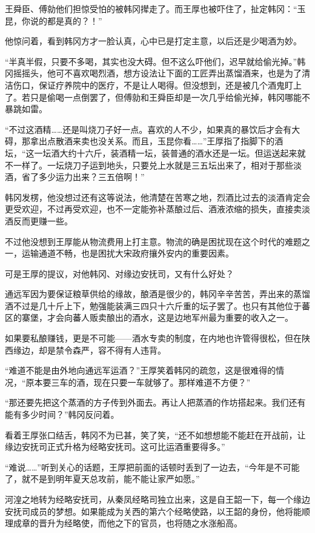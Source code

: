 王舜臣、傅勍他们担惊受怕的被韩冈撵走了。而王厚也被吓住了，扯定韩冈：“玉昆，你说的都是真的？！”

他惊问着，看到韩冈方才一脸认真，心中已是打定主意，以后还是少喝酒为妙。

“半真半假，只要不多喝，其实也没大碍。但不这么吓他们，迟早就给偷光掉。”韩冈摇摇头，他可不喜欢喝烈酒，想方设法让下面的工匠弄出蒸馏酒来，也是为了清洁伤口，保证疗养院中的医疗，不是让人喝得。但没想到，还是被几个酒鬼盯上了。若只是偷喝一点倒罢了，但傅勍和王舜臣却是一次几乎给偷光掉，韩冈哪能不暴跳如雷。

“不过这酒精……还是叫烧刀子好一点。喜欢的人不少，如果真的暴饮后才会有大碍，那拿出点散酒来卖也没关系。而且，玉昆你看……”王厚指了指脚下的酒坛，“这一坛酒大约十六斤，装酒精一坛，装普通的酒水还是一坛。但运送起来就不一样了。一坛烧刀子运到地头，只要兑上水就是三五坛出来了，相对于那些淡酒，省了多少运力出来？三五倍啊！”

韩冈发楞，他没想过还有这等说法，他清楚在苦寒之地，烈酒比过去的淡酒肯定会更受欢迎，不过再受欢迎，也不一定能弥补蒸酿过后、酒液浓缩的损失，直接卖淡酒反而更赚一些。

不过他没想到王厚能从物流费用上打主意。物流的确是困扰现在这个时代的难题之一，运输通道不畅，也是困扰大宋政府攘外安内的重要因素。

可是王厚的提议，对他韩冈、对缘边安抚司，又有什么好处？

通远军因为要保证粮草供给的缘故，酿酒是很少的，韩冈辛辛苦苦，弄出来的蒸馏酒不过是几十斤上下，勉强能装满三四只十六斤重的坛子罢了。也只有其他位于蕃区的寨堡，才会向蕃人贩卖酿出的酒水，这是边地军州最为重要的收入之一。

如果要私酿赚钱，更是不可能——酒水专卖的制度，在内地也许管得很松，但在陕西缘边，却是禁令森严，容不得有人违背。

“难道不能是由外地向通远军运酒？”王厚笑着韩冈的疏忽，这是很难得的情况，“原本要三车的酒，现在只要一车就够了。那样难道不方便？”

“那还要先把这个蒸酒的方子传到外面去。再让人把蒸酒的作坊搭起来。我们还有能有多少时间？”韩冈反问着。

看着王厚张口结舌，韩冈不为已甚，笑了笑，“还不如想想能不能赶在开战前，让缘边安抚司正式升格为经略安抚司。这可比运酒重要得多。”

“难说……”听到关心的话题，王厚把前面的话顿时丢到了一边去，“今年是不可能了，就不是到明年夏天总攻前，能不能让家严如愿。”

河湟之地转为经略安抚司，从秦凤经略司独立出来，这是自王韶一下，每一个缘边安抚司成员的梦想。如果能成为关西的第六个经略使路，以王韶的身份，他将能顺理成章的晋升为经略使，而他之下的官员，也将随之水涨船高。

